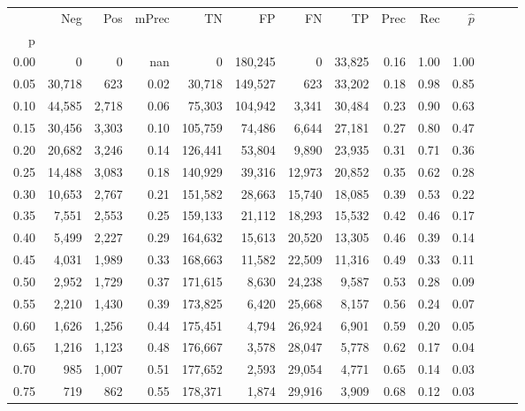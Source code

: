 \begin{tabular}{rrrrrrrrrrrrrr}
\toprule
{} &     Neg &    Pos & mPrec &       TN &       FP &      FN &      TP &  Prec &   Rec & $\hat{p}$ \\
p    &         &        &       &          &          &         &         &       &       &           \\
\midrule
0.00 &       0 &      0 &   nan &        0 &  180,245 &       0 &  33,825 &  0.16 &  1.00 &      1.00 \\
0.05 &  30,718 &    623 &  0.02 &   30,718 &  149,527 &     623 &  33,202 &  0.18 &  0.98 &      0.85 \\
0.10 &  44,585 &  2,718 &  0.06 &   75,303 &  104,942 &   3,341 &  30,484 &  0.23 &  0.90 &      0.63 \\
0.15 &  30,456 &  3,303 &  0.10 &  105,759 &   74,486 &   6,644 &  27,181 &  0.27 &  0.80 &      0.47 \\
0.20 &  20,682 &  3,246 &  0.14 &  126,441 &   53,804 &   9,890 &  23,935 &  0.31 &  0.71 &      0.36 \\
0.25 &  14,488 &  3,083 &  0.18 &  140,929 &   39,316 &  12,973 &  20,852 &  0.35 &  0.62 &      0.28 \\
0.30 &  10,653 &  2,767 &  0.21 &  151,582 &   28,663 &  15,740 &  18,085 &  0.39 &  0.53 &      0.22 \\
0.35 &   7,551 &  2,553 &  0.25 &  159,133 &   21,112 &  18,293 &  15,532 &  0.42 &  0.46 &      0.17 \\
0.40 &   5,499 &  2,227 &  0.29 &  164,632 &   15,613 &  20,520 &  13,305 &  0.46 &  0.39 &      0.14 \\
0.45 &   4,031 &  1,989 &  0.33 &  168,663 &   11,582 &  22,509 &  11,316 &  0.49 &  0.33 &      0.11 \\
0.50 &   2,952 &  1,729 &  0.37 &  171,615 &    8,630 &  24,238 &   9,587 &  0.53 &  0.28 &      0.09 \\
0.55 &   2,210 &  1,430 &  0.39 &  173,825 &    6,420 &  25,668 &   8,157 &  0.56 &  0.24 &      0.07 \\
0.60 &   1,626 &  1,256 &  0.44 &  175,451 &    4,794 &  26,924 &   6,901 &  0.59 &  0.20 &      0.05 \\
0.65 &   1,216 &  1,123 &  0.48 &  176,667 &    3,578 &  28,047 &   5,778 &  0.62 &  0.17 &      0.04 \\
0.70 &     985 &  1,007 &  0.51 &  177,652 &    2,593 &  29,054 &   4,771 &  0.65 &  0.14 &      0.03 \\
0.75 &     719 &    862 &  0.55 &  178,371 &    1,874 &  29,916 &   3,909 &  0.68 &  0.12 &      0.03 \\

\end{tabular}
